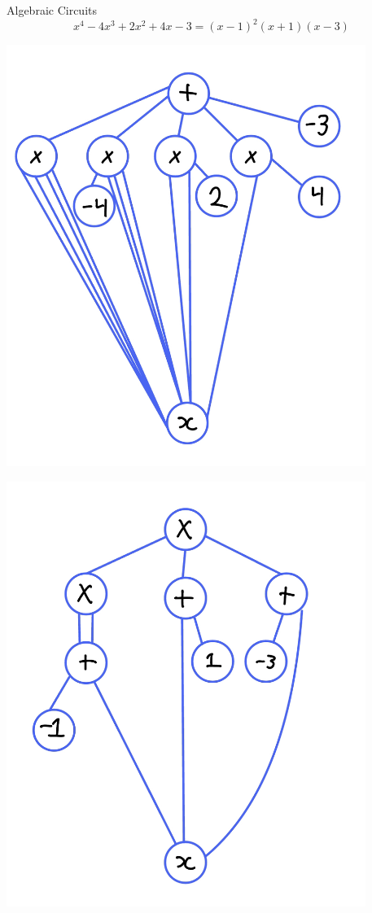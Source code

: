 \documentclass[aspectratio=169]{beamer}
\begin{document}
\begin{frame}{Algebraic Circuits}
    \[
        x^4 - 4 x^3 + 2 x^2 + 4 x - 3 = (x - 1)^2(x + 1)(x - 3)
    \]
    \begin{minipage}[t]{0.49\textwidth}
        \includegraphics[width=0.875\textwidth]{unfac.jpeg}
    \end{minipage}\pause
    \begin{minipage}[t]{0.49\textwidth}
        \includegraphics[width=0.875\textwidth]{fac.jpeg}
    \end{minipage}
\end{frame}
\end{document}
